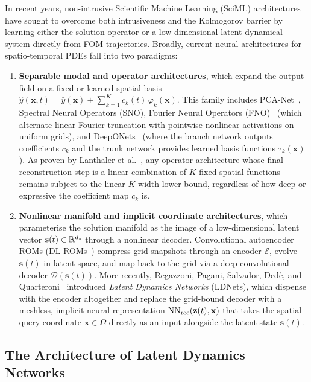 In recent years, non-intrusive Scientific Machine Learning (SciML) architectures have sought to overcome both intrusiveness and the Kolmogorov barrier by learning either the solution operator or a low-dimensional latent dynamical system directly from FOM trajectories. Broadly, current neural architectures for spatio-temporal PDEs fall into two paradigms:
\begin{enumerate}[leftmargin=2em]
  \item \textbf{Separable modal and operator architectures}, which expand the output field on a fixed or learned spatial basis $\hat{y}(\mathbf{x},t) = \bar{y}(\mathbf{x}) + \sum_{k=1}^K c_k(t)\,\varphi_k(\mathbf{x})$. This family includes PCA-Net~\cite{bhattacharya2021model}, Spectral Neural Operators (SNO), Fourier Neural Operators (FNO)~\cite{li2021fourier} (which alternate linear Fourier truncation with pointwise nonlinear activations on uniform grids), and DeepONets~\cite{lu2021learning} (where the branch network outputs coefficients $c_k$ and the trunk network provides learned basis functions $\tau_k(\mathbf{x})$). As proven by Lanthaler et al.~\cite{lanthaler2022nonlinear}, any operator architecture whose final reconstruction step is a linear combination of $K$ fixed spatial functions remains subject to the linear $K$-width lower bound, regardless of how deep or expressive the coefficient map $c_k$ is.
  \item \textbf{Nonlinear manifold and implicit coordinate architectures}, which parameterise the solution manifold as the image of a low-dimensional latent vector $\mathbf{s}(t)\in\mathbb{R}^{d_s}$ through a nonlinear decoder. Convolutional autoencoder ROMs (DL-ROMs~\cite{lee2020model,fresca2021comprehensive}) compress grid snapshots through an encoder $\mathcal{E}$, evolve $\mathbf{s}(t)$ in latent space, and map back to the grid via a deep convolutional decoder $\mathcal{D}(\mathbf{s}(t))$. More recently, Regazzoni, Pagani, Salvador, Ded\`e, and Quarteroni~\cite{regazzoni2024learning} introduced \emph{Latent Dynamics Networks} (LDNets), which dispense with the encoder altogether and replace the grid-bound decoder with a meshless, implicit neural representation $\mathrm{NN}_{\mathrm{rec}}(\mathbf{z}(t),\mathbf{x})$ that takes the spatial query coordinate $\mathbf{x}\in\Omega$ directly as an input alongside the latent state $\mathbf{s}(t)$.
\end{enumerate}

\subsection{The Architecture of Latent Dynamics Networks}


